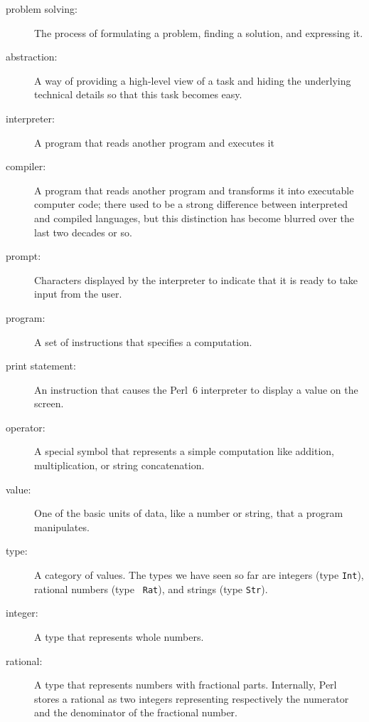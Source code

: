 \begin{description}

\item[problem solving:]  The process of formulating a problem, finding
a solution, and expressing it.

\item[abstraction:] A way of providing a high-level view 
of a task and hiding the underlying technical details so 
that this task becomes easy.

\item[interpreter:]  A program that reads another program and executes it

\item[compiler:]  A program that reads another program and 
transforms it into executable computer code; there used to be 
a strong difference between interpreted and compiled languages, 
but this distinction has become blurred over the last 
two decades or so.

\item[prompt:] Characters displayed by the interpreter to indicate
that it is ready to take input from the user.

\item[program:] A set of instructions that specifies a computation.

\item[print statement:]  An instruction that causes the Perl~6
interpreter to display a value on the screen.

\item[operator:]  A special symbol that represents a simple computation like
addition, multiplication, or string concatenation.

\item[value:]  One of the basic units of data, like a number or string, 
that a program manipulates.

\item[type:] A category of values.  The types we have seen so far
are integers (type {\tt Int}), rational numbers (type {\tt
Rat}), and strings (type {\tt Str}).

\item[integer:] A type that represents whole numbers.

\item[rational:] A type that represents numbers with fractional
parts. Internally, Perl stores a rational as two integers 
representing respectively the numerator and the denominator 
of the fractional number.


\end{description}
